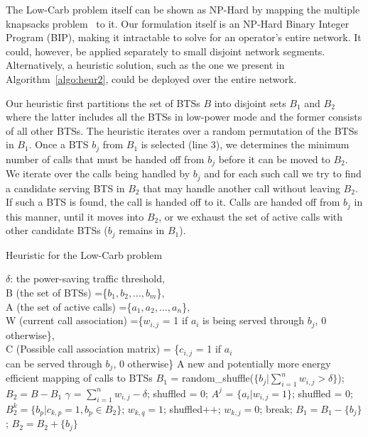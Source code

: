 The Low-Carb problem itself can be shown as NP-Hard by mapping the multiple knapsacks problem~\cite{kellerer:knapsackproblems:2005} to it. Our formulation itself is an NP-Hard Binary Integer Program
(BIP), making it intractable to solve for an
operator's entire network. It could, however, be applied separately to small disjoint network segments. Alternatively, a heuristic solution, such as the one we present in Algorithm~\ref{algo:heur2}, could be deployed over the entire network.

Our heuristic first partitions the set of BTSs $B$ into disjoint sets $B_1$ and $B_2$ where the latter includes all the BTSs in low-power mode and the former consists of all other BTSs. The heuristic iterates over a random permutation of the BTSs in $B_1$. Once a BTS $b_j$ from $B_1$ is selected (line 3), we determines the minimum number of calls that must be handed off from $b_j$ before it can be moved to $B_2$. We iterate over the calls being handled by $b_j$ and for each such call we try to find a candidate serving BTS in $B_2$ that may handle another call without leaving $B_2$. If such a BTS is found, the call is handed off to it. Calls are handed off from $b_j$ in this manner, until it moves into $B_2$, or we exhaust the set of active calls with other candidate BTSs ($b_j$ remains in $B_1$). 

\begin{algorithm}
\caption{Heuristic for the Low-Carb problem}
\label{algo:heur2}
\begin{algorithmic}[1]
\REQUIRE $\delta$: the power-saving traffic threshold,\\B (the set of BTSs) =\{$b_1, b_2, ..., b_m$\},\\A (the set of active calls) =\{$a_1, a_2, ..., a_n$\},\\W (current call association) =\{$w_{i,j}$ = 1 if $a_i$ is being served through $b_j$, 0 otherwise\},\\C (Possible call association matrix) = \{$c_{i,j}$ = 1 if $a_i$ \\can be served through $b_j$, 0 otherwise\}
\ENSURE A new and potentially more energy efficient mapping of calls to BTSs
\STATE $B_1$ = random\_shuffle($\{b_j | \sum\limits_{i=1}^{n}w_{i,j}>\delta\}$); 
\STATE $B_2=B - B_1$
	\STATE $\gamma$ = $\sum\limits_{i=1}^{n}w_{i,j} - \delta$; \quad shuffled = 0;
	\STATE $A^j$ = $\{a_i | w_{i,j}=1\}$; \quad shuffled = 0;
			\STATE $B_2^k = \{b_p | c_{k,p}=1, b_p \in B_2\}$;
					\STATE $w_{k,q} = 1$; \quad shuffled++;
					\STATE $w_{k,j} = 0$; \quad break;
				\ENDIF
			\ENDFOR
		\ENDIF
	\ENDFOR
\STATE $B_1 = B_1 - \{b_j\}$; \quad $B_2 = B_2 + \{b_j\}$
\ENDIF
\ENDFOR
\end{algorithmic}
\end{algorithm}

